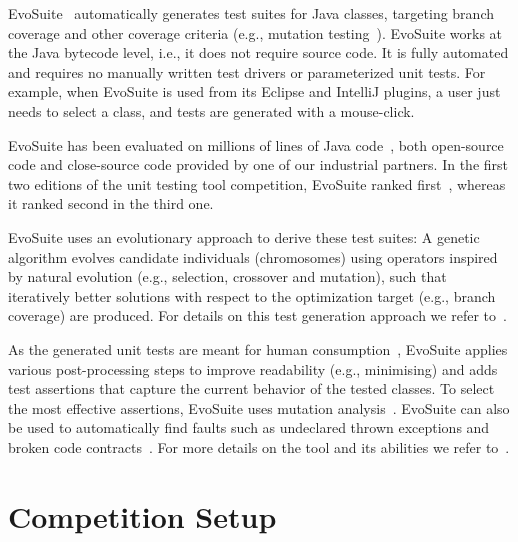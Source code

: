\documentclass[10pt,conference]{IEEEtran}
\newcommand{\EVOSUITE}{{\sc EvoSuite}\xspace}
\begin{document}
\EVOSUITE~\cite{FrA11c,GoA_TSE12} automatically generates test suites
for Java classes, targeting branch coverage and other coverage
criteria (e.g., mutation testing~\cite{emse14_mutation}). \EVOSUITE
works at the Java bytecode level, i.e., it does not require source
code. It is fully automated and requires no manually written test
drivers or parameterized unit tests.  For example, when \EVOSUITE is
used from its Eclipse and IntelliJ plugins, a user
just needs to select a class, and tests are generated with a mouse-click.

\EVOSUITE has been evaluated on millions of lines of Java
code~\cite{fraser2014large}, both open-source code and close-source
code provided by one of our industrial partners.  In the first two
editions of the unit testing tool competition, \EVOSUITE ranked
first~\cite{evosuiteAtSbst2013,evosuiteAtFittest2013}, whereas it
ranked second in the third one.


\EVOSUITE uses an evolutionary approach to derive these test suites: A
genetic algorithm evolves candidate individuals (chromosomes) using
operators inspired by natural evolution (e.g., selection, crossover
and mutation), such that iteratively better solutions with respect to
the optimization target (e.g., branch coverage) are produced.  For
details on this test generation approach we refer to~\cite{GoA_TSE12}.


As the generated unit tests are meant for human
consumption~\cite{fraser2013does}, \EVOSUITE applies various
post-processing steps to improve readability (e.g., minimising) and
adds test assertions that capture the current behavior of the tested
classes. To select the most effective assertions, \EVOSUITE uses
mutation analysis~\cite{10.1109/TSE.2011.93}.  \EVOSUITE can also be
used to automatically find faults such as undeclared thrown exceptions
and broken code contracts~\cite{emse13_oracle}.  For more details on
the tool and its abilities we refer to~\cite{FrA11c,FrA13a}.

\section{Competition Setup}
\end{document}
